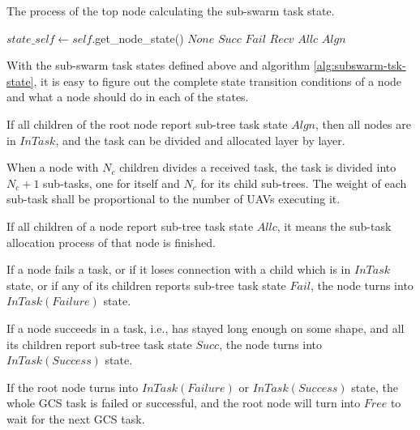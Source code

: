 \begin{algorithm}
\caption{The process of the top node calculating the sub-swarm task state.}
\label{alg:subswarm-tsk-state}
\begin{algorithmic}[1]
\State $state\_self \gets self$.get\_node\_state()
    \State \Return $None$
    \State \Return $Succ$
    \State \Return $Fail$
\Else {}
        \State \Return $Recv$
    \Else {}
            \State \Return $Allc$
        \Else
            \State \Return $Algn$
        \EndIf
    \EndIf
\EndIf
\EndFunction
\end{algorithmic}
\end{algorithm}

With the sub-swarm task states defined above and algorithm \ref{alg:subswarm-tsk-state},
it is easy to figure out the complete state transition conditions of a node
and what a node should do in each of the states.
\begin{remark}
If all children of the root node report sub-tree task state $Algn$,
then all nodes are in $InTask$, and the task can be divided and allocated layer by layer.
\end{remark}
When a node with $N_c$ children divides a received task,
the task is divided into $N_c + 1$ sub-tasks, one for itself and $N_c$ for its child sub-trees.
The weight of each sub-task shall be proportional to the number of UAVs executing it.
\begin{remark}
If all children of a node report sub-tree task state $Allc$,
it means the sub-task allocation process of that node is finished.
\end{remark}
\begin{remark}
If a node fails a task,
or if it loses connection with a child which is in $InTask$ state,
or if any of its children reports sub-tree task state $Fail$,
the node turns into $InTask(Failure)$ state.
\end{remark}
\begin{remark}
If a node succeeds in a task, i.e., has stayed long enough on some shape,
and all its children report sub-tree task state $Succ$,
the node turns into $InTask(Success)$ state.
\end{remark}
If the root node turns into $InTask(Failure)$ or $InTask(Success)$ state,
the whole GCS task is failed or successful,
and the root node will turn into $Free$ to wait for the next GCS task.

